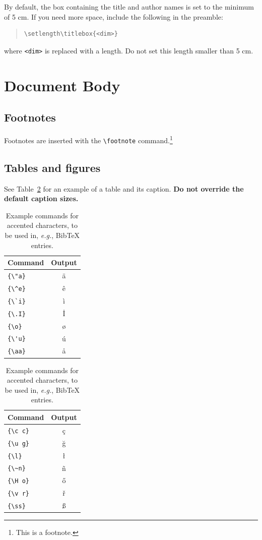 \documentclass[11pt, a4paper, logo, copyright]{dmml}
\begin{document}
By default, the box containing the title and author names is set to the minimum of 5 cm. If you need more space, include the following in the preamble:
\begin{quote}
\begin{verbatim}
\setlength\titlebox{<dim>}
\end{verbatim}
\end{quote}
where \verb|<dim>| is replaced with a length. Do not set this length smaller than 5 cm.

\section{Document Body}

\subsection{Footnotes}

Footnotes are inserted with the \verb|\footnote| command.\footnote{This is a footnote.}

\subsection{Tables and figures}

See Table~\ref{tab:accents} for an example of a table and its caption.
\textbf{Do not override the default caption sizes.}

\begin{table}
  \centering
  \begin{tabular}{lc}
    \hline
    \textbf{Command} & \textbf{Output} \\
    \hline
    \verb|{\"a}|     & {\"a}           \\
    \verb|{\^e}|     & {\^e}           \\
    \verb|{\`i}|     & {\`i}           \\
    \verb|{\.I}|     & {\.I}           \\
    \verb|{\o}|      & {\o}            \\
    \verb|{\'u}|     & {\'u}           \\
    \verb|{\aa}|     & {\aa}           \\\hline
  \end{tabular}
  \begin{tabular}{lc}
    \hline
    \textbf{Command} & \textbf{Output} \\
    \hline
    \verb|{\c c}|    & {\c c}          \\
    \verb|{\u g}|    & {\u g}          \\
    \verb|{\l}|      & {\l}            \\
    \verb|{\~n}|     & {\~n}           \\
    \verb|{\H o}|    & {\H o}          \\
    \verb|{\v r}|    & {\v r}          \\
    \verb|{\ss}|     & {\ss}           \\
    \hline
  \end{tabular}
  \caption{Example commands for accented characters, to be used in, \emph{e.g.}, Bib\TeX{} entries.}
  \label{tab:accents}
\end{table}
\end{document}
